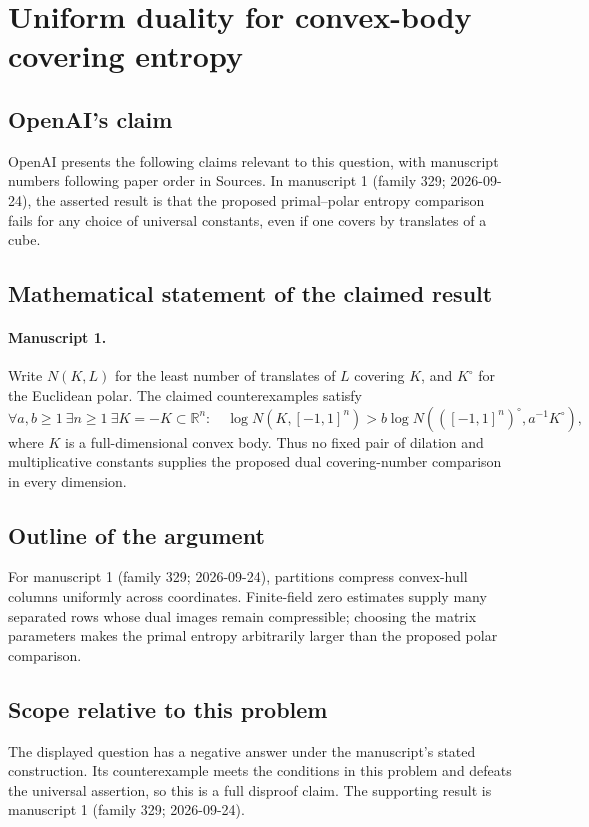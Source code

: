 \documentclass[11pt]{article}
\begin{document}
\section*{Uniform duality for convex-body covering entropy}

\subsection{OpenAI's claim}
OpenAI presents the following claims relevant to this question, with manuscript numbers following paper order in Sources. In manuscript 1 (family 329; 2026-09-24), the asserted result is that the proposed primal--polar entropy comparison fails for any choice of universal constants, even if one covers by translates of a cube.

\subsection{Mathematical statement of the claimed result}
\paragraph{Manuscript 1.}
Write $N(K,L)$ for the least number of translates of $L$ covering $K$, and $K^{\circ}$ for the Euclidean polar. The claimed counterexamples satisfy
\[
 \forall a,b\ge1\ \exists n\ge1\ \exists K=-K\subset\mathbb R^n:\quad
 \log N(K,[-1,1]^n)>b\log N(([-1,1]^n)^{\circ},a^{-1}K^{\circ}),
\]
where $K$ is a full-dimensional convex body. Thus no fixed pair of dilation and multiplicative constants supplies the proposed dual covering-number comparison in every dimension.

\subsection{Outline of the argument}
For manuscript 1 (family 329; 2026-09-24), partitions compress convex-hull columns uniformly across coordinates. Finite-field zero estimates supply many separated rows whose dual images remain compressible; choosing the matrix parameters makes the primal entropy arbitrarily larger than the proposed polar comparison.

\subsection{Scope relative to this problem}
The displayed question has a negative answer under the manuscript's stated construction. Its counterexample meets the conditions in this problem and defeats the universal assertion, so this is a full disproof claim. The supporting result is manuscript 1 (family 329; 2026-09-24).
\end{document}
